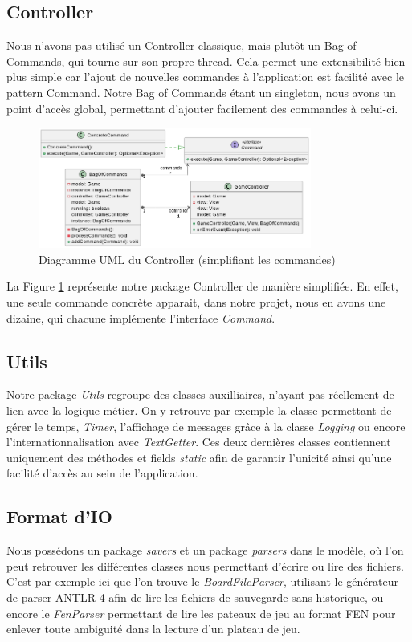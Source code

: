 \documentclass{article}
\begin{document}
\subsection{Controller}
Nous n'avons pas utilisé un Controller classique, mais plutôt un Bag of Commands, qui tourne sur son propre thread. Cela permet une extensibilité
bien plus simple car l'ajout de nouvelles commandes à l'application est facilité avec le pattern Command.
Notre Bag of Commands étant un singleton, nous avons un point d'accès global, permettant d'ajouter facilement des commandes à celui-ci.
\begin{figure}[h]
    \centering
    \includegraphics[width=0.8\textwidth]{uml_controller}
    \caption{Diagramme UML du Controller (simplifiant les commandes)}
    \label{umlController}
\end{figure}
\FloatBarrier
La Figure \ref{umlController} représente notre package Controller de manière simplifiée. 
En effet, une seule commande concrète apparait, dans notre projet,
nous en avons une dizaine, qui chacune implémente l'interface \textit{Command}.

\subsection{Utils}
Notre package \textit{Utils} regroupe des classes auxilliaires, n'ayant pas réellement de lien avec la logique métier.
On y retrouve par exemple la classe permettant de gérer le temps, \textit{Timer}, l'affichage de messages grâce à la classe \textit{Logging}
ou encore l'internationnalisation avec \textit{TextGetter}. Ces deux dernières classes contiennent uniquement des méthodes et fields \textit{static}
afin de garantir l'unicité ainsi qu'une facilité d'accès au sein de l'application.

\subsection{Format d'IO}
Nous possédons un package \textit{savers} et un package \textit{parsers} dans le modèle, où l'on peut retrouver les différentes classes nous permettant d'écrire ou lire des fichiers.
C'est par exemple ici que l'on trouve le \textit{BoardFileParser}, utilisant le générateur de parser ANTLR-4 afin de lire les fichiers de sauvegarde sans historique, ou encore le \textit{FenParser} permettant
de lire les pateaux de jeu au format FEN pour enlever toute ambiguité dans la lecture d'un plateau de jeu.
\end{document}
